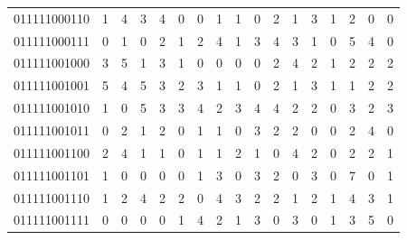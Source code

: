 \documentclass[10pt,a4paper]{article}
\begin{document}
\begin{longtable}{ |c|c|c|c|c|c|c|c|c|c|c|c|c|c|c|c|c| }
    011111000110              & 1                            & 4                                & 3                            & 4                              & 0   & 0   & 1   & 1   & 0   & 2   & 1   & 3   & 1   & 2   & 0   & 0   \\
    011111000111              & 0                            & 1                                & 0                            & 2                              & 1   & 2   & 4   & 1   & 3   & 4   & 3   & 1   & 0   & 5   & 4   & 0   \\
    011111001000              & 3                            & 5                                & 1                            & 3                              & 1   & 0   & 0   & 0   & 0   & 2   & 4   & 2   & 1   & 2   & 2   & 2   \\
    011111001001              & 5                            & 4                                & 5                            & 3                              & 2   & 3   & 1   & 1   & 0   & 2   & 1   & 3   & 1   & 1   & 2   & 2   \\
    011111001010              & 1                            & 0                                & 5                            & 3                              & 3   & 4   & 2   & 3   & 4   & 4   & 2   & 2   & 0   & 3   & 2   & 3   \\
    011111001011              & 0                            & 2                                & 1                            & 2                              & 0   & 1   & 1   & 0   & 3   & 2   & 2   & 0   & 0   & 2   & 4   & 0   \\
    011111001100              & 2                            & 4                                & 1                            & 1                              & 0   & 1   & 1   & 2   & 1   & 0   & 4   & 2   & 0   & 2   & 2   & 1   \\
    011111001101              & 1                            & 0                                & 0                            & 0                              & 0   & 1   & 3   & 0   & 3   & 2   & 0   & 3   & 0   & 7   & 0   & 1   \\
    011111001110              & 1                            & 2                                & 4                            & 2                              & 2   & 0   & 4   & 3   & 2   & 2   & 1   & 2   & 1   & 4   & 3   & 1   \\
    011111001111              & 0                            & 0                                & 0                            & 0                              & 1   & 4   & 2   & 1   & 3   & 0   & 3   & 0   & 1   & 3   & 5   & 0   \\

\end{longtable}
\end{document}
